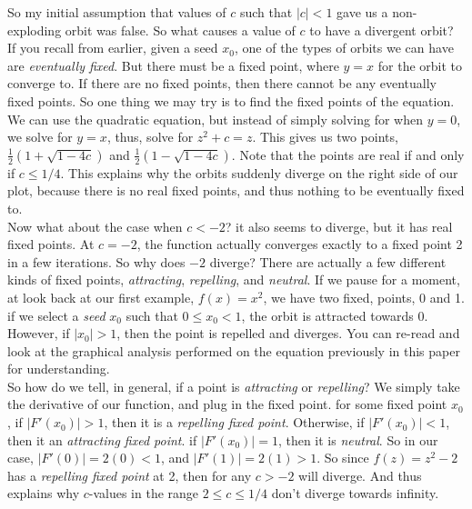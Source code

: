 \documentclass[20pt]{article} %
\begin{document}
So my initial assumption that values of $c$ such that $|c| < 1$ gave us a non-exploding orbit was false. So what causes a value of $c$ to have a divergent orbit?  If you recall from earlier, given a seed $x_0$, one of the types of orbits we can have are \textit{eventually fixed}. But there must be a fixed point, where $y=x$ for the orbit to converge to.  If there are no fixed points, then there cannot be any eventually fixed points.  So one thing we may try is to find the fixed points of the equation.  We can use the quadratic equation, but instead of simply solving for when $y=0$, we solve for $y=x$, thus, solve for $z^{2}+c=z$.  This gives us two points, $\frac{1}{2}(1+\sqrt{1-4c})$ and $\frac{1}{2}(1-\sqrt{1-4c})$.  Note that the points are real if and only if $c \leq 1/4$.  This explains why the orbits suddenly diverge on the right side of our plot, because there is no real fixed points, and thus nothing to be eventually fixed to. \\

\newpage
Now what about the case when $c < -2$? it also seems to diverge, but it has real fixed points. At $c = -2$, the function actually converges exactly to a fixed point 2 in a few iterations.  So why does $-2$ diverge? There are actually a few different kinds of fixed points, \textit{attracting}, \textit{repelling}, and \textit{neutral}.  If we pause for a moment, at look back at our first example, $f(x)=x^{2}$, we have two fixed, points, 0 and 1.  if we select a \textit{seed} $x_0$ such that $0 \leq x_0 < 1$, the orbit is attracted towards 0.  However, if $|x_0| > 1$, then the point is repelled and diverges.  You can re-read and look at the graphical analysis performed on the equation previously in this paper for understanding.  \\

So how do we tell, in general, if a point is \textit{attracting} or \textit{repelling}?  We simply take the derivative of our function, and plug in the fixed point. for some fixed point $x_0$, if $|F'(x_0)| > 1$, then it is a \textit{repelling fixed point}. Otherwise, if $|F'(x_0)| < 1$, then it an \textit{attracting fixed point}. if $|F'(x_0)| = 1$, then it is \textit{neutral}. So in our case, $|F'(0)| = 2(0) < 1$, and $|F'(1)| = 2(1) > 1$.  So since $f(z)=z^{2}-2$ has a \textit{repelling fixed point} at 2, then for any $c>-2$ will diverge. And thus explains why $c$-values in the range $2 \leq c \leq 1/4$ don't diverge towards infinity.

\end{document}
